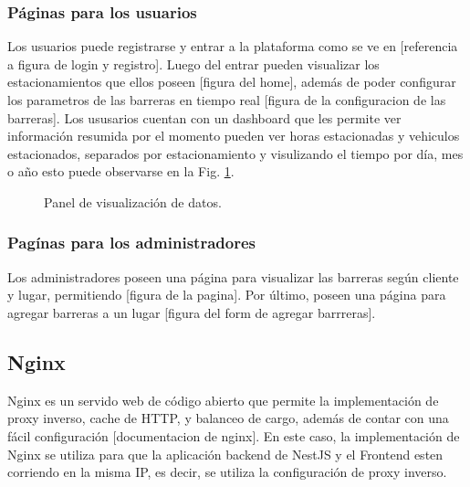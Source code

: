 \subsubsection*{Páginas para los usuarios}

Los usuarios puede registrarse y entrar a la plataforma como se ve en [referencia a figura de login y registro]. Luego del entrar pueden visualizar los estacionamientos que ellos poseen [figura del home], además de poder configurar los parametros de las barreras en tiempo real [figura de la configuracion de las barreras]. Los ususarios cuentan con un dashboard que les permite ver información resumida por el momento pueden ver horas estacionadas y vehiculos estacionados, separados por estacionamiento y visulizando el tiempo por día, mes o año esto puede observarse en la Fig. \ref{fig:dashboard}.


\begin{figure}
    \centering

    \caption{Panel de visualización de datos.}
    \label{fig:dashboard}
\end{figure}

\subsubsection*{Pagínas para los administradores}

Los administradores poseen una página para visualizar las barreras según cliente y lugar, permitiendo [figura de la pagina]. Por último, poseen una página para agregar barreras a un lugar [figura del form de agregar barrreras].

\subsection{Nginx}

Nginx es un servido web de código abierto que permite la implementación de proxy inverso, cache de HTTP, y balanceo de cargo, además de contar con una fácil configuración [documentacion de nginx].
En este caso, la implementación de Nginx se utiliza para que la aplicación backend de NestJS y el Frontend esten corriendo en la misma IP, es decir, se utiliza la configuración de proxy inverso.

